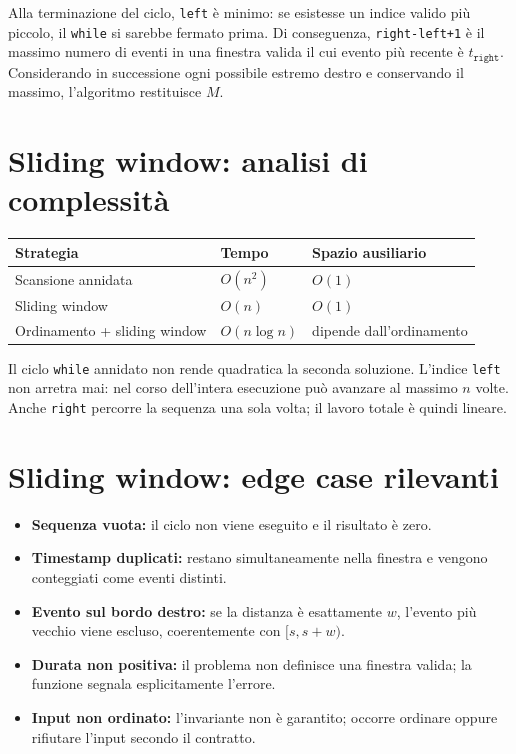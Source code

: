 Alla terminazione del ciclo, \texttt{left} è minimo: se esistesse un indice
valido più piccolo, il \texttt{while} si sarebbe fermato prima. Di
conseguenza, \texttt{right-left+1} è il massimo numero di eventi in una
finestra valida il cui evento più recente è $t_{\texttt{right}}$.
Considerando in successione ogni possibile estremo destro e conservando il
massimo, l'algoritmo restituisce $M$.

\clearpage
\thispagestyle{fancy}
\noindent\rule{0pt}{2cm}\par
\section{Sliding window: analisi di complessità}

\begin{center}
\begin{tabular}{@{}lll@{}}
\toprule
Strategia & Tempo & Spazio ausiliario \\
\midrule
Scansione annidata & $O(n^2)$ & $O(1)$ \\
Sliding window & $O(n)$ & $O(1)$ \\
Ordinamento + sliding window & $O(n\log n)$ & dipende dall'ordinamento \\
\bottomrule
\end{tabular}
\end{center}

Il ciclo \texttt{while} annidato non rende quadratica la seconda soluzione.
L'indice \texttt{left} non arretra mai: nel corso dell'intera esecuzione può
avanzare al massimo $n$ volte. Anche \texttt{right} percorre la sequenza una
sola volta; il lavoro totale è quindi lineare.

\section{Sliding window: edge case rilevanti}

\begin{itemize}
  \item \textbf{Sequenza vuota:} il ciclo non viene eseguito e il risultato è
        zero.
  \item \textbf{Timestamp duplicati:} restano simultaneamente nella finestra
        e vengono conteggiati come eventi distinti.
  \item \textbf{Evento sul bordo destro:} se la distanza è esattamente $w$,
        l'evento più vecchio viene escluso, coerentemente con $[s,s+w)$.
  \item \textbf{Durata non positiva:} il problema non definisce una finestra
        valida; la funzione segnala esplicitamente l'errore.
  \item \textbf{Input non ordinato:} l'invariante non è garantito; occorre
        ordinare oppure rifiutare l'input secondo il contratto.
\end{itemize}


